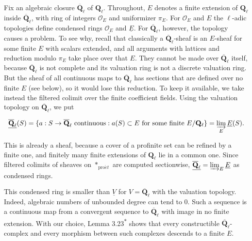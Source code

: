 \documentclass[11pt]{article}
\newcommand{\bpout}[1]{#1\textsuperscript{\hyperlink{bp-outside}{\ensuremath{\ast}}}}
\begin{document}
Fix an algebraic closure \(\overline{\mathbf Q}_\ell\) of \(\mathbf Q_\ell\). Throughout, \(E\) denotes a finite extension of \(\mathbf Q_\ell\) inside \(\overline{\mathbf Q}_\ell\), with ring of integers \(\mathcal O_E\) and uniformizer \(\pi_E\). For \(\mathcal O_E\) and \(E\) the \(\ell\)-adic topologies define condensed rings \(\underline{\mathcal O_E}\) and \(\underline E\). For \(\overline{\mathbf Q}_\ell\), however, the topology causes a problem. To see why, recall that classically a \(\overline{\mathbf Q}_\ell\)-sheaf is an \(E\)-sheaf for some finite \(E\) with scalars extended, and all arguments with lattices and reduction modulo \(\pi_E\) take place over that \(E\). They cannot be made over \(\overline{\mathbf Q}_\ell\) itself, because \(\overline{\mathbf Q}_\ell\) is not complete and its valuation ring is not a discrete valuation ring. But the sheaf of all continuous maps to \(\overline{\mathbf Q}_\ell\) has sections that are defined over no finite \(E\) (see below), so it would lose this reduction. To keep it available, we take instead the filtered colimit over the finite coefficient fields. Using the valuation topology on \(\overline{\mathbf Q}_\ell\), we put

\[
\underline{\overline{\mathbf Q}_\ell}(S)=
\{a:S\to\overline{\mathbf Q}_\ell\text{ continuous}:a(S)\subset E\text{ for some finite }E/\mathbf Q_\ell\}
=\varinjlim_E\underline E(S).
\]

This is already a sheaf, because a cover of a profinite set can be refined by a finite one, and finitely many finite extensions of \(\mathbf Q_\ell\) lie in a common one. Since filtered colimits of sheaves on \(*_{\mathrm{pro}\acute{e}t}\) are computed sectionwise, \(\underline{\overline{\mathbf Q}_\ell}=\varinjlim_E\underline E\) as condensed rings.

This condensed ring is smaller than \(\underline V\) for \(V=\overline{\mathbf Q}_\ell\) with the valuation topology. Indeed, algebraic numbers of unbounded degree can tend to \(0\). Such a sequence is a continuous map from a convergent sequence to \(\overline{\mathbf Q}_\ell\) with image in no finite extension. With our choice, Lemma \bpout{3.23} shows that every constructible \(\overline{\mathbf Q}_\ell\)-complex and every morphism between such complexes descends to a finite \(E\).


\end{document}
